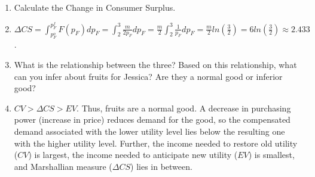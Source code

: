 \documentclass{article}
\begin{document}
\begin{enumerate}
\begin{enumerate}[label=(\alph*)]
\item Calculate the Change in Consumer Surplus.
\item[] $\Delta CS=\int^{p_F^f}_{p_F^o}F(p_F)dp_F=\int^3_2\frac{m}{2p_F}dp_F=\frac{m}{2}\int^3_2\frac{1}{p_F}dp_F=\frac{m}{2}ln(\frac{3}{2})=6ln(\frac{3}{2})\approx2.433$.
\item What is the relationship between the three? Based on this relationship, what can you infer about fruits for Jessica? Are they a normal good or inferior good?
\item[] $CV>\Delta CS>EV$. Thus, fruits are a normal good. A decrease in purchasing power (increase in price) reduces demand for the good, so the compensated demand associated with the lower utility level lies below the resulting one with the higher utility level. Further, the income needed to restore old utility ($CV$) is largest, the income needed to anticipate new utility ($EV$) is smallest, and Marshallian measure ($\Delta CS$) lies in between.
\end{enumerate}
\end{enumerate}
\end{document}
